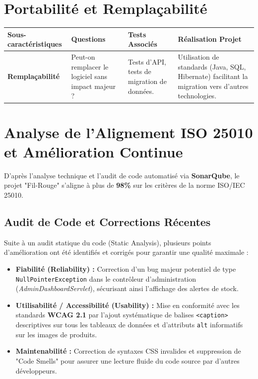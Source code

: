 \documentclass[12pt,a4paper]{report}
\begin{document}
\section{Portabilité et Remplaçabilité}
\begin{table}[ht!]
\centering\small
\begin{tabular}{|p{3.5cm}|p{3cm}|p{3.5cm}|p{4cm}|}
\hline
\rowcolor{headerblue}\color{white}Sous-caractéristiques & \color{white}Questions & \color{white}Tests Associés & \color{white}Réalisation Projet \\ \hline
\textbf{Remplaçabilité} & Peut-on remplacer le logiciel sans impact majeur ? & Tests d'API, tests de migration de données. & Utilisation de standards (Java, SQL, Hibernate) facilitant la migration vers d'autres technologies. \\ \hline
\end{tabular}
\end{table}

\section{Analyse de l'Alignement ISO 25010 et Amélioration Continue}
D'après l'analyse technique et l'audit de code automatisé via \textbf{SonarQube}, le projet "Fil-Rouge" s'aligne à plus de \textbf{98\%} sur les critères de la norme ISO/IEC 25010. 

\subsection{Audit de Code et Corrections Récentes}
Suite à un audit statique du code (Static Analysis), plusieurs points d'amélioration ont été identifiés et corrigés pour garantir une qualité maximale :
\begin{itemize}
    \item \textbf{Fiabilité (Reliability) :} Correction d'un bug majeur potentiel de type \texttt{NullPointerException} dans le contrôleur d'administration (\textit{AdminDashboardServlet}), sécurisant ainsi l'affichage des alertes de stock.
    \item \textbf{Utilisabilité / Accessibilité (Usability) :} Mise en conformité avec les standards \textbf{WCAG 2.1} par l'ajout systématique de balises \texttt{<caption>} descriptives sur tous les tableaux de données et d'attributs \texttt{alt} informatifs sur les images de produits.
    \item \textbf{Maintenabilité :} Correction de syntaxes CSS invalides et suppression de "Code Smells" pour assurer une lecture fluide du code source par d'autres développeurs.
\end{itemize}
\end{document}

